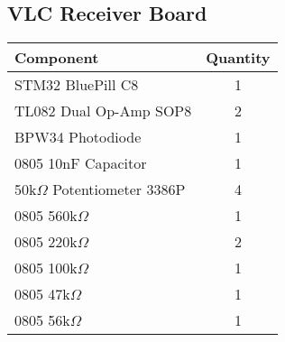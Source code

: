 \subsection{VLC Receiver Board}
\begin{center}
\setlength\extrarowheight{7pt}
\begin{tabular}{lc}
{\large Component} & {\large Quantity} \\\midrule
{\large STM32 BluePill C8} & {\large 1} \\
{\large TL082 Dual Op-Amp SOP8} & {\large 2}\\
{\large BPW34 Photodiode} & {\large 1}\\
{\large 0805 10nF Capacitor} & {\large 1}\\
{\large 50k{$\Omega$} Potentiometer 3386P} & {\large 4}\\
{\large 0805 560k$\Omega$} & {\large 1}\\
{\large 0805 220k$\Omega$} & {\large 2}\\
{\large 0805 100k$\Omega$} & {\large 1}\\
{\large 0805 47k$\Omega$} & {\large 1}\\
{\large 0805 56k$\Omega$} & {\large 1}\\
\end{tabular}
\end{center}
